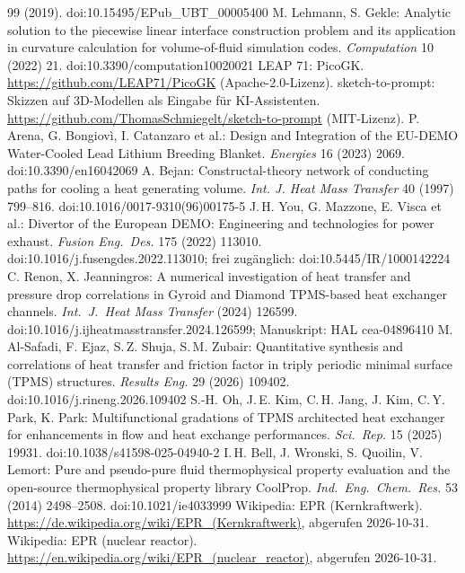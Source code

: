 \documentclass[10pt,a4paper]{article}
\begin{document}
\begin{thebibliography}{99}
  (2019). doi:10.15495/EPub\_UBT\_00005400
 M. Lehmann, S. Gekle: Analytic solution to the piecewise linear interface
  construction problem and its application in curvature calculation for volume-of-fluid simulation codes.
  \emph{Computation} 10 (2022) 21. doi:10.3390/computation10020021
 LEAP 71: PicoGK. \url{https://github.com/LEAP71/PicoGK} (Apache-2.0-Lizenz).
 sketch-to-prompt: Skizzen auf 3D-Modellen als Eingabe für KI-Assistenten.
  \url{https://github.com/ThomasSchmiegelt/sketch-to-prompt} (MIT-Lizenz).
 P. Arena, G. Bongiovì, I. Catanzaro et al.: Design and Integration of the EU-DEMO Water-Cooled Lead
  Lithium Breeding Blanket. \emph{Energies} 16 (2023) 2069. doi:10.3390/en16042069
 A. Bejan: Constructal-theory network of conducting paths for cooling a heat generating volume.
  \emph{Int. J. Heat Mass Transfer} 40 (1997) 799--816. doi:10.1016/0017-9310(96)00175-5
 J.\,H. You, G. Mazzone, E. Visca et al.: Divertor of the European DEMO: Engineering and technologies
  for power exhaust. \emph{Fusion Eng.\ Des.} 175 (2022) 113010. doi:10.1016/j.fusengdes.2022.113010;
  frei zugänglich: doi:10.5445/IR/1000142224
 C. Renon, X. Jeanningros: A numerical investigation of heat transfer and pressure drop correlations in
  Gyroid and Diamond TPMS-based heat exchanger channels. \emph{Int.\ J.\ Heat Mass Transfer} (2024) 126599.
  doi:10.1016/j.ijheatmasstransfer.2024.126599; Manuskript: HAL cea-04896410
 M. Al-Safadi, F. Ejaz, S.\,Z. Shuja, S.\,M. Zubair: Quantitative synthesis and correlations of heat
  transfer and friction factor in triply periodic minimal surface (TPMS) structures. \emph{Results Eng.} 29 (2026)
  109402. doi:10.1016/j.rineng.2026.109402
 S.-H. Oh, J.\,E. Kim, C.\,H. Jang, J. Kim, C.\,Y. Park, K. Park: Multifunctional gradations of TPMS
  architected heat exchanger for enhancements in flow and heat exchange performances. \emph{Sci.\ Rep.} 15 (2025)
  19931. doi:10.1038/s41598-025-04940-2
 I.\,H. Bell, J. Wronski, S. Quoilin, V. Lemort: Pure and pseudo-pure fluid thermophysical property
  evaluation and the open-source thermophysical property library CoolProp. \emph{Ind.\ Eng.\ Chem.\ Res.} 53 (2014)
  2498--2508. doi:10.1021/ie4033999
 Wikipedia: EPR (Kernkraftwerk). \url{https://de.wikipedia.org/wiki/EPR_(Kernkraftwerk)}, abgerufen 2026-10-31.
 Wikipedia: EPR (nuclear reactor). \url{https://en.wikipedia.org/wiki/EPR_(nuclear_reactor)}, abgerufen 2026-10-31.

\end{thebibliography}
\end{document}
